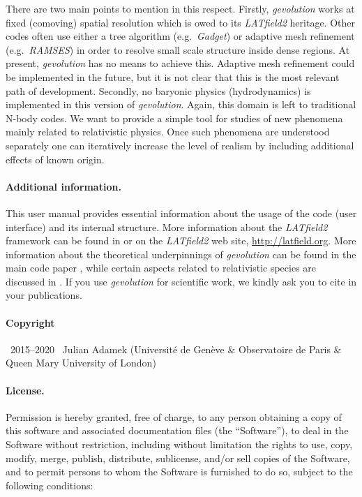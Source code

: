 \documentclass[a4paper,10pt]{article}
\begin{document}
There are two main points to mention in this respect. Firstly, \textit{gevolution} works at fixed (comoving) spatial resolution which is
owed to its \textit{LATfield2} heritage. Other codes often use either a tree algorithm (e.g.\ \textit{Gadget}) or adaptive mesh
refinement (e.g.\ \textit{RAMSES}) in order to resolve small scale structure inside dense regions. At present, \textit{gevolution} has no
means to achieve this. Adaptive mesh refinement could be implemented in the future, but it is not clear that this is the most relevant
path of development. Secondly, no baryonic physics (hydrodynamics) is implemented in this version of \textit{gevolution}. Again, this
domain is left to traditional N-body codes. We want to provide a simple tool for studies of new phenomena mainly related to relativistic 
physics. Once such phenomena are understood separately one can iteratively increase the level of realism by including additional effects of 
known origin.

\paragraph{Additional information.} This user manual provides essential information about the usage of the code (user interface) and its
internal structure. More information about the \textit{LATfield2} framework can be found in \cite{David:2015eya} or on the
\textit{LATfield2} web site, \url{http://latfield.org}. More information about the theoretical underpinnings of \textit{gevolution} can
be found in the main code paper \cite{Adamek:2016zes}, while certain aspects related to relativistic species are discussed in \cite{Adamek:2017grt,Adamek:2017uiq}.
If you use \textit{gevolution} for scientific work, we kindly ask you to cite
\cite{Adamek:2015eda} in your publications.

\paragraph{Copyright} \textcopyright~2015--2020~ Julian Adamek (Universit\'e de Gen\`eve \& Observatoire de Paris \& Queen Mary University of London)

\paragraph{License.} Permission is hereby granted, free of charge, to any person obtaining a copy
of this software and associated documentation files (the ``Software''), to deal
in the Software without restriction, including without limitation the rights
to use, copy, modify, merge, publish, distribute, sublicense, and/or sell
copies of the Software, and to permit persons to whom the Software is
furnished to do so, subject to the following conditions:
  
\end{document}

